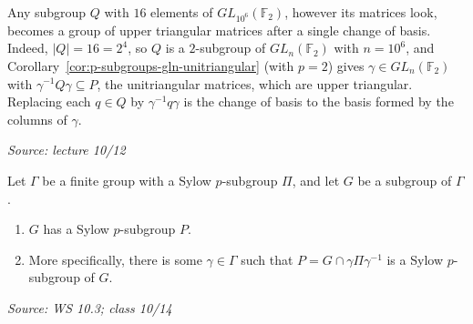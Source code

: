 \documentclass[11pt]{report}
\newcommand{\srcline}[1]{\par\hfill{\footnotesize\textit{Source: #1}}}
\begin{document}
\begin{exbox}\label{ex:order-16-subgroups-gl-f2}
Any subgroup $Q$ with $16$ elements of $GL_{10^6}(\mathbb{F}_2)$, however its matrices look, becomes a group of upper triangular matrices after a single change of basis. Indeed, $|Q| = 16 = 2^4$, so $Q$ is a $2$-subgroup of $GL_n(\mathbb{F}_2)$ with $n = 10^6$, and Corollary~\ref{cor:p-subgroups-gln-unitriangular} (with $p = 2$) gives $\gamma \in GL_n(\mathbb{F}_2)$ with $\gamma^{-1}Q\gamma \subseteq P$, the unitriangular matrices, which are upper triangular. Replacing each $q \in Q$ by $\gamma^{-1}q\gamma$ is the change of basis to the basis formed by the columns of $\gamma$.
\srcline{lecture 10/12}
\end{exbox}

\begin{propbox}\label{prop:sylow-of-subgroup}
Let $\Gamma$ be a finite group with a Sylow $p$-subgroup $\Pi$, and let $G$ be a subgroup of $\Gamma$.
\begin{enumerate}
    \item $G$ has a Sylow $p$-subgroup $P$.
    \item More specifically, there is some $\gamma \in \Gamma$ such that $P = G \cap \gamma\Pi\gamma^{-1}$ is a Sylow $p$-subgroup of $G$.
\end{enumerate}
\srcline{WS 10.3; class 10/14}
\end{propbox}
\end{document}
